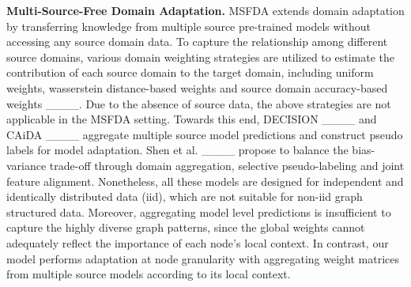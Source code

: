 \textbf{Multi-Source-Free Domain Adaptation.} MSFDA extends domain adaptation by transferring knowledge from multiple source pre-trained models without accessing any source domain data. To capture the relationship among different source domains, various domain weighting strategies are utilized to estimate the contribution of each source domain to the target domain, including uniform weights, wasserstein distance-based weights and source domain accuracy-based weights ____. Due to the absence of source data, the above strategies are not applicable in the MSFDA setting. Towards this end, DECISION ____ and CAiDA ____ aggregate multiple source model predictions and construct pseudo labels for model adaptation. Shen et al. ____ propose to balance the bias-variance trade-off through domain aggregation, selective pseudo-labeling and joint feature alignment. Nonetheless, all these models are designed for independent and identically distributed data (iid), which are not suitable for non-iid graph structured data. Moreover, aggregating model level predictions is insufficient to capture the highly diverse graph patterns, since the global weights cannot adequately reflect the importance of each node's local context. In contrast, our model performs adaptation at node granularity with aggregating weight matrices from multiple source models according to its local context.